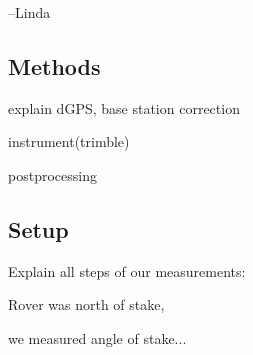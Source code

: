 --Linda

\subsection{Methods}
explain dGPS, base station correction

instrument(trimble)

postprocessing


\subsection{Setup}
Explain all steps of our measurements:

Rover was north of stake,

we measured angle of stake...